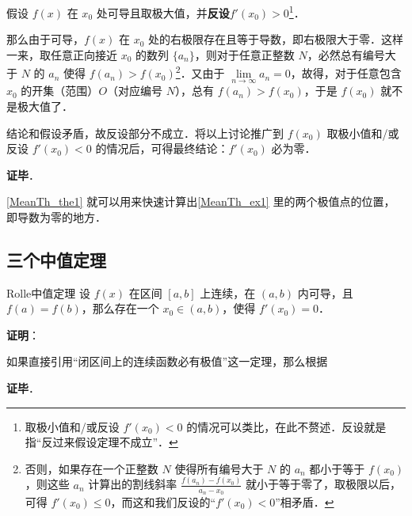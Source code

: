 假设 $f(x)$ 在 $x_0$ 处可导且取极大值，并\textbf{反设}$f'(x_0)>0$\footnote{取极小值和/或反设 $f'(x_0)<0$ 的情况可以类比，在此不赘述．反设就是指“反过来假设定理不成立”．}．

那么由于可导，$f(x)$ 在 $x_0$ 处的右极限存在且等于导数，即右极限大于零．这样一来，取任意正向接近 $x_0$ 的数列 $\{a_n\}$，则对于任意正整数 $N$，必然总有编号大于 $N$ 的 $a_n$ 使得 $f(a_n)>f(x_0)$\footnote{否则，如果存在一个正整数 $N$ 使得所有编号大于 $N$ 的 $a_n$ 都小于等于 $f(x_0)$，则这些 $a_n$ 计算出的割线斜率 $\frac{f(a_n)-f(x_0)}{a_n-x_0}$ 就小于等于零了，取极限以后，可得 $f'(x_0)\leq 0$，而这和我们反设的“$f'(x_0)<0$”相矛盾．}．又由于 $\lim\limits_{n\to\infty}a_n=0$，故得，对于任意包含 $x_0$ 的开集（范围）$O$（对应编号 $N$），总有 $f(a_n)>f(x_0)$，于是 $f(x_0)$ 就不是极大值了．

结论和假设矛盾，故反设部分不成立．将以上讨论推广到 $f(x_0)$ 取极小值和/或反设 $f'(x_0)<0$ 的情况后，可得最终结论：$f'(x_0)$ 必为零．

\textbf{证毕}．

\autoref{MeanTh_the1} 就可以用来快速计算出\autoref{MeanTh_ex1} 里的两个极值点的位置，即导数为零的地方．


\subsection{三个中值定理}


\begin{definition}{Rolle中值定理}
设 $f(x)$ 在区间 $[a, b]$ 上连续，在 $(a, b)$ 内可导，且 $f(a)=f(b)$，那么存在一个 $x_0\in(a, b)$，使得 $f'(x_0)=0$．
\end{definition}


\textbf{证明}：

如果直接引用“闭区间上的连续函数必有极值”这一定理，那么根据

\textbf{证毕}．














